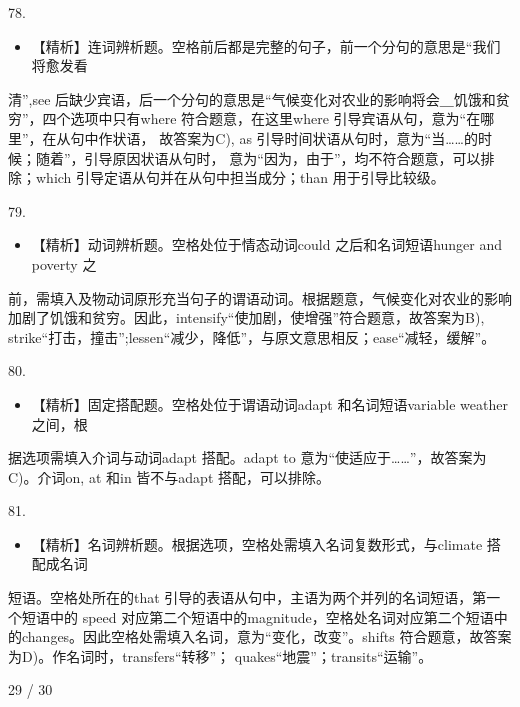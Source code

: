 \documentclass[UTF8,11pt]{ctexart}
\begin{document}
78.


\begin{itemize}[leftmargin=2em,itemsep=.2em,topsep=.4em]\item[C.] 【精析】连词辨析题。空格前后都是完整的句子，前一个分句的意思是“我们将愈发看
\end{itemize}

清”,see 后缺少宾语，后一个分句的意思是“气候变化对农业的影响将会＿饥饿和贫穷”，四个选项中只有where 符合题意，在这里where 引导宾语从句，意为“在哪里”，在从句中作状语， 故答案为C), as 引导时间状语从句时，意为“当……的时候；随着”，引导原因状语从句时， 意为“因为，由于”，均不符合题意，可以排除；which 引导定语从句并在从句中担当成分；than 用于引导比较级。


79.


\begin{itemize}[leftmargin=2em,itemsep=.2em,topsep=.4em]\item[B.] 【精析】动词辨析题。空格处位于情态动词could 之后和名词短语hunger and poverty 之
\end{itemize}

前，需填入及物动词原形充当句子的谓语动词。根据题意，气候变化对农业的影响加剧了饥饿和贫穷。因此，intensify“使加剧，使增强”符合题意，故答案为B), strike“打击，撞击”;lessen“减少，降低”，与原文意思相反；ease“减轻，缓解”。


80.


\begin{itemize}[leftmargin=2em,itemsep=.2em,topsep=.4em]\item[C.] 【精析】固定搭配题。空格处位于谓语动词adapt 和名词短语variable weather 之间，根
\end{itemize}

据选项需填入介词与动词adapt 搭配。adapt to 意为“使适应于……”，故答案为C)。介词on, at 和in 皆不与adapt 搭配，可以排除。


81.


\begin{itemize}[leftmargin=2em,itemsep=.2em,topsep=.4em]\item[D.] 【精析】名词辨析题。根据选项，空格处需填入名词复数形式，与climate 搭配成名词
\end{itemize}

短语。空格处所在的that 引导的表语从句中，主语为两个并列的名词短语，第一个短语中的 speed 对应第二个短语中的magnitude，空格处名词对应第二个短语中的changes。因此空格处需填入名词，意为“变化，改变”。shifts 符合题意，故答案为D)。作名词时，transfers“转移”； quakes“地震”；transits“运输”。


29 / 30
\end{document}
